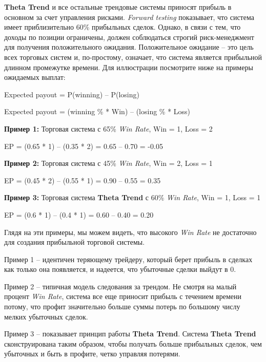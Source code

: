 \documentclass[12pt,DIV=18]{scrartcl}
\begin{document}
\bigskip
 
\textbf{Theta Trend} и все остальные трендовые системы приносят прибыль в основном за счет управления рисками. \textit{Forward  testing} показывает, что система имеет приблизительно 60\% прибыльных сделок. Однако, в связи с тем, что доходы по позиции ограничены, должен соблюдаться строгий риск-менеджмент для получения положительного ожидания. Положительное ожидание -- это цель всех торговых систем и, по-простому, означает, что система является прибыльной длинном промежутке времени. Для иллюстрации посмотрите ниже на примеры ожидаемых выплат:
 
\bigskip
 
\setlength{\parindent}{0.5cm}
Expected payout = P(winning) -- P(losing)\par
Expected payout = (winning \% * Win) -- (losing \% * Loss)\par
\bigskip
\textbf{Пример 1:} Торговая система с 65\% \textit{Win Rate}, Win = 1, Loss = 2\par
\bigskip
EP = (0.65 * 1) -- (0.35 * 2) = 0.65 -- 0.70 = -0.05\par
\bigskip
\textbf{Пример 2:} Торговая система с 45\% \textit{Win Rate}, Win = 2, Loss = 1\par
\bigskip
EP = (0.45 * 2) -- (0.55 * 1) = 0.90 -- 0.55 = 0.35\par
\bigskip
\textbf{Пример 3:} Торговая система \textbf{Theta Trend} с 60\% \textit{Win Rate}, Win = 1, Loss = 1\par
\bigskip
EP = (0.6 * 1) -- (0.4 * 1) = 0.60 -- 0.40 = 0.20\par

\bigskip
 
Глядя на эти примеры, мы можем видеть, что высокого \textit{Win Rate} не достаточно для создания прибыльной торговой системы.
 
\bigskip
 
Пример 1 -- идентичен теряющему трейдеру, который берет прибыль в сделках как только она появляется, и надеется, что убыточные сделки выйдут в 0.

\bigskip
 
Пример 2 -- типичная модель следования за трендом. Не смотря на малый процент \textit{Win Rate}, система все еще приносит прибыль с течением времени потому, что профит значительно больше суммы потерь по большому числу мелких убыточных сделок.

\bigskip
 
Пример 3 -- показывает принцип работы \textbf{Theta Trend}. Система \textbf{Theta Trend} сконструирована таким образом, чтобы получать больше прибыльных сделок, чем убыточных и быть в профите, четко управляя потерями. 
\end{document}
